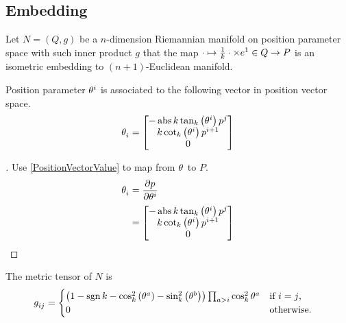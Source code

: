 \documentclass[stu, babel, american, biblatex, a4paper, draftall]{apa7}
\begin{document}
\subsection{Embedding}
\begin{definition}\label{Embedding}
    Let $N=\left(Q,g\right)$ be a $n$-dimension Riemannian manifold
    on position parameter space with such inner product $g$ that
    the map $\cdot\mapsto\frac{1}{k}\cdot\times\tensor{e}{^1}\in Q\to P$ is an isometric embedding to $\left(n+1\right)$-Euclidean manifold.
\end{definition}
\begin{lemma}\label{Model:Basis}
    Position parameter $\tensor{\theta}{^i}$ is associated to the following vector in position vector space.
    \begin{equation*}
        \tensor{\theta}{_i} =
        \begin{bmatrix}
            -\abs{k}\tan_k\left(\tensor{\theta}{^i}\right)\tensor{p}{^j} \\
            k\cot_k\left(\tensor{\theta}{^i}\right)\tensor{p}{^{i+1}}          \\
            0                                           \\
        \end{bmatrix}
    \end{equation*}
\end{lemma}
\begin{proof}[]
    \skipped

    Use \cref{PositionVectorValue} to map from $\tensor{\theta}{}$ to $P$.
    \begin{align*}
        {\tensor{\theta}{_i}}
         & =
        \frac{\partial\tensor{p}{}}{\partial\tensor{\theta}{^i}} \\
         & =
        \begin{bmatrix}
            -\abs{k}\tan_k\left(\tensor{\theta}{^i}\right)\tensor{p}{^j} \\
            k\cot_k\left(\tensor{\theta}{^i}\right)\tensor{p}{^{i+1}}          \\
            0                                           \\
        \end{bmatrix}
    \end{align*}
\end{proof}
\begin{lemma}\label{Model:MetricTensor}
    The metric tensor of $N$ is
    \begin{align*}
        \tensor{g}{_i_j} & =
        \begin{cases}
            \left(
            1 - \sign{k}
            - \cos_k^2\left(\tensor{\theta}{^a}\right)
            - \sin_k^2\left(\tensor{\theta}{^b}\right)
        \right)\prod_{a>i}{\cos_k^2{\tensor{\theta}{^a}}} & \text{if $i=j$,}  \\
            0                                          & \text{otherwise.} \\
        \end{cases}
    \end{align*}
\end{lemma}
\end{document}
